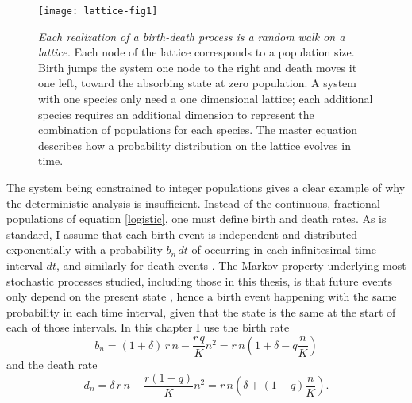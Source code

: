 \begin{figure}[h]
	\centering
	\texttt{[image: lattice-fig1]}
	\caption{\emph{Each realization of a birth-death process is a random walk on a lattice.} Each node of the lattice corresponds to a population size. Birth jumps the system one node to the right and death moves it one left, toward the absorbing state at zero population. A system with one species only need a one dimensional lattice; each additional species requires an additional dimension to represent the combination of populations for each species. The master equation describes how a probability distribution on the lattice evolves in time. 
	} \label{latticefig}
\end{figure}

The system being constrained to integer populations gives a clear example of why the deterministic analysis is insufficient. 
Instead of the continuous, fractional populations of equation \ref{logistic}, one must define birth and death rates. 
As is standard, I assume that each birth event is independent and distributed exponentially with a probability $b_n\,dt$ of occurring in each infinitesimal time interval $dt$, and similarly for death events \cite{Nisbet1982,Gardiner2004a,VanKampen1992}. 
The Markov property underlying most stochastic processes studied, including those in this thesis, is that future events only depend on the present state \cite{Nisbet1982,Gardiner2004a,VanKampen1992}, hence a birth event happening with the same probability in each time interval, given that the state is the same at the start of each of those intervals. 
In this chapter I use the birth rate
\begin{equation}
b_n = (1 + \delta)\,r\,n - \frac{r\,q}{K}n^2 = r\,n\left(1+\delta-q\frac{n}{K}\right)
\label{birth}
\end{equation}
and the death rate
\begin{equation}
d_n = \delta\,r\,n + \frac{r(1-q)}{K} n^2 = r\,n\left(\delta+(1-q)\frac{n}{K}\right).
\label{death}
\end{equation}

